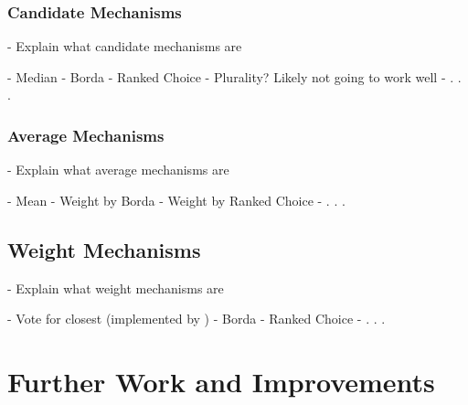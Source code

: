 \subsubsection{Candidate Mechanisms}\label{subsubsec:candidate-mechanisms}
- Explain what candidate mechanisms are

- Median
- Borda
- Ranked Choice
- Plurality? Likely not going to work well
- . . .

\subsubsection{Average Mechanisms}\label{subsubsec:average-mechanisms}
- Explain what average mechanisms are

- Mean
- Weight by Borda
- Weight by Ranked Choice
- . . .

\subsection{Weight Mechanisms}\label{subsec:weight-mechanisms}
- Explain what weight mechanisms are

- Vote for closest (implemented by \cite{Cohensius2017})
- Borda
- Ranked Choice
- . . .


\section{Further Work and Improvements}\label{sec:further-work-and-improvements}

